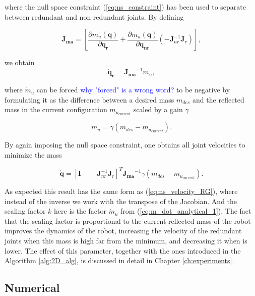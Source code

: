 where the null space constraint (\ref{eq:ns_constraint}) has been used to separate between redundant and non-redundant joints. By defining

\begin{equation}
\mathbf{J_{ma}} = \left[ \frac{\partial {m_u(\mathbf{q})}}{\partial{\mathbf{q_{r}}}} + \frac{\partial {m_u(\mathbf{q})}}{\partial{\mathbf{q_{nr}}}}  (- \mathbf{J}_{nr}^{-1} \mathbf{J}_r) \right ] ,
\label{eq:jma}
\end{equation}

we obtain 
\begin{equation}
\mathbf{\dot{q}_r} = \mathbf{J_{ma}}^{-1} {\dot{m}_u},
\label{eq:qr_jma}
\end{equation}

where ${\dot{m}_u}$ can be forced  \textcolor{blue}{why "forced" is a wrong word?} to be negative by formulating it as the difference between a desired mass $m_{des}$ and the reflected mass in the current configuration $m_{u_{current}}$ scaled by a gain $\gamma$


\begin{equation}
{\dot{m}_u} =  \gamma (m_{des} - m_{u_{current}}).
\label{eq:m_dot_analytical_1}
\end{equation}

By again imposing the null space constraint, one obtains all joint velocities to minimize the mass

\begin{equation}
\mathbf{\dot{q}} = [\mathbf{I} \quad  -\mathbf{J}_{nr}^{-1} \mathbf{J}_r]^T   \mathbf{J_{ma}}^{-1} \gamma (m_{des} - m_{u_{current}})  .
\label{eq:qdot_analytical}
\end{equation}

As expected this result has the same form as (\ref{eq:ns_velocity_RG}), where instead of the inverse we work with the transpose of the Jacobian. And the scaling factor $k$ here is the factor $\dot{m}_u$ from (\ref{eq:m_dot_analytical_1}). The fact that the scaling factor is proportional to the current reflected mass of the robot improves the dynamics of the robot, increasing the velocity of the redundant joints when this mass is high far from the minimum, and decreasing it when is lower. 
The effect of this parameter, together with the ones introduced in the Algorithm \ref{alg:2D_alg}, is discussed in detail in Chapter \ref{ch:experiments}.



\subsection{Numerical}
\label{sec:numerical}


